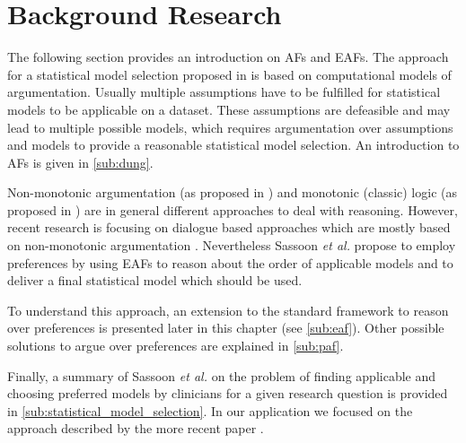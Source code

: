 \section{Background Research}
\label{sec:background}


The following section provides an introduction on \glspl{AF} and \glspl{EAF}. The approach for a statistical model selection proposed in \cite{sassoon2014} is based on computational models of argumentation. Usually multiple assumptions have to be fulfilled for statistical models to be applicable on a dataset. These assumptions are defeasible and may lead to multiple possible models, which requires argumentation over assumptions and models to provide a reasonable statistical model selection. An introduction to \glspl{AF} is given in \autoref{sub:dung}. 

Non-monotonic argumentation (as proposed in \cite{liao,dung1995}) and monotonic (classic) logic (as proposed in \cite{Reiter1980}) are in general different approaches to deal with reasoning. However, recent research is focusing on dialogue based approaches which are mostly based on non-monotonic argumentation \cite{parsons2000,Walton1995}. 
Nevertheless Sassoon \textit{et al.} propose to employ preferences by using \glspl{EAF} to reason about the order of applicable models and to deliver a final statistical model which should be used. 

To understand this approach, an extension to the standard framework to reason over preferences is presented later in this chapter (see \autoref{sub:eaf}). Other possible solutions to argue over preferences are explained in \autoref{sub:paf}.

Finally, a summary of Sassoon \textit{et al.} \cite{sassoon2014} on the problem of finding applicable and choosing preferred models by clinicians for a given research question is provided in \autoref{sub:statistical_model_selection}. In our application we focused on the approach described by the more recent paper \cite{sassoon2016CD}.







 

